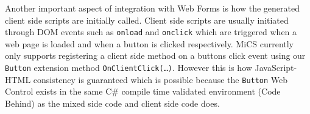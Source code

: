 	Another important aspect of integration with Web Forms is how the generated client side scripts are initially called. Client side scripts are usually initiated through DOM events such as \texttt{onload} and \texttt{onclick} which are triggered when a web page is loaded and when a button is clicked respectively. MiCS currently only supports registering a client side method on a buttons click event using our \texttt{Button} extension method \texttt{OnClientClick(…)}. However this is how JavaScript-HTML consistency is guaranteed which is possible because the \texttt{Button} Web Control exists in the same C\# compile time validated environment (Code Behind) as the mixed side code and client side code does.

